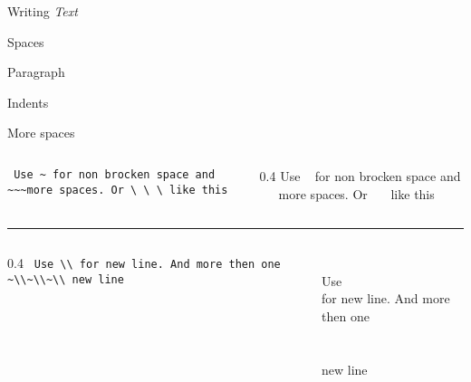 \graphicspath{{sec03/images/s2/}{sec03/code/s2/}}
\lstset{inputpath=sec03/code/s2/}

\begin{frame}[fragile]{Writing \textit{Text}}\relax

\cprotect{}

\end{frame}

\begin{frame}[fragile]{Spaces}\relax
\cprotect{}
\end{frame}

\begin{frame}[fragile]{Paragraph}\relax
\cprotect{}
\end{frame}

\begin{frame}[fragile]{Indents}\relax
\cprotect{}
\end{frame}

\begin{frame}[fragile]{More spaces}\relax
\begin{columns}
\begin{column}{0.4\textwidth}
     \lstinline[basicstyle=\tt\normalsize]| Use ~ for non brocken space and ~~~more spaces. Or \ \ \ like this|
\end{column}
\begin{column}{0.4\textwidth}
     Use ~ for non brocken space and ~~~more spaces. Or \ \ \ like this
\end{column}
\end{columns}
\hrule
\begin{columns}
\begin{column}{0.4\textwidth}
     \lstinline[basicstyle=\tt\normalsize]| Use \\ for new line. And more then one ~\\~\\~\\ new line|
\end{column}
\begin{column}{0.4\textwidth}
~\\
     Use \\ for new line. And more then one ~\\~\\~\\ new line
\end{column}
\end{columns}

\end{frame}

